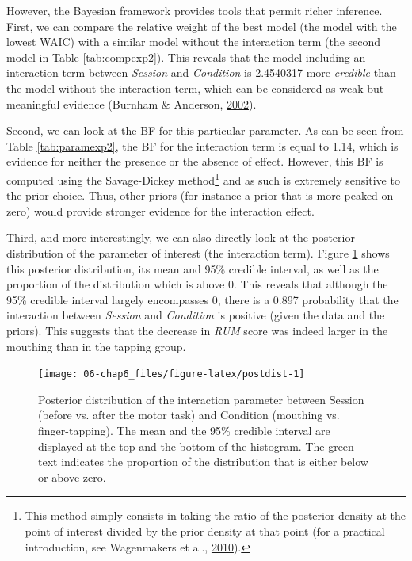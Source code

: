\documentclass[a4paper,12pt,twoside,onecolumn,openright,final,oldfontcommands]{memoir}
\let\rmarkdownfootnote\footnote%
\def\footnote{\protect\rmarkdownfootnote}
\begin{document}
However, the Bayesian framework provides tools that permit richer inference. First, we can compare the relative weight of the best model (the model with the lowest WAIC) with a similar model without the interaction term (the second model in Table \ref{tab:compexp2}). This reveals that the model including an interaction term between \emph{Session} and \emph{Condition} is 2.4540317 more \emph{credible} than the model without the interaction term, which can be considered as weak but meaningful evidence (Burnham \& Anderson, \protect\hyperlink{ref-burnham_model_2002}{2002}).

Second, we can look at the BF for this particular parameter. As can be seen from Table \ref{tab:paramexp2}, the BF for the interaction term is equal to 1.14, which is evidence for neither the presence or the absence of effect. However, this BF is computed using the Savage-Dickey method\footnote{This method simply consists in taking the ratio of the posterior density at the point of interest divided by the prior density at that point (for a practical introduction, see Wagenmakers et al., \protect\hyperlink{ref-wagenmakers_bayesian_2010}{2010}).} and as such is extremely sensitive to the prior choice. Thus, other priors (for instance a prior that is more peaked on zero) would provide stronger evidence for the interaction effect.

Third, and more interestingly, we can also directly look at the posterior distribution of the parameter of interest (the interaction term). Figure \ref{fig:postdist} shows this posterior distribution, its mean and 95\% credible interval, as well as the proportion of the distribution which is above 0. This reveals that although the 95\% credible interval largely encompasses 0, there is a 0.897 probability that the interaction between \emph{Session} and \emph{Condition} is positive (given the data and the priors). This suggests that the decrease in \emph{RUM} score was indeed larger in the mouthing than in the tapping group.

\begin{figure}[ht]

{\centering \texttt{[image: 06-chap6\_files/figure-latex/postdist-1]} 

}

\caption{Posterior distribution of the interaction parameter between Session (before vs. after the motor task) and Condition (mouthing vs. finger-tapping). The mean and the 95\% credible interval are displayed at the top and the bottom of the histogram. The green text indicates the proportion of the distribution that is either below or above zero.}\label{fig:postdist}
\end{figure}
\end{document}

